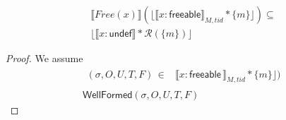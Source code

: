  \begin{lemma}
   \label{lemma:free}
\begin{align*}
  \llbracket Free(x) \rrbracket (\lfloor \llbracket x:\textsf{freeable} \rrbracket_{M,tid} * \{m\}\rfloor)  \subseteq \\
                                                              \lfloor \llbracket x:\textsf{undef} \rrbracket  * \mathcal{R}(\{m\})\rfloor
\end{align*}
 \end{lemma}
 \begin{proof}
We assume
\begin{gather}\label{ahu1free}
  \begin{aligned}
    (\sigma, O, U, T,F) \, \in &  \llbracket x:\textsf{freeable} \, \rrbracket_{M,tid} * \{m\}\rfloor) 
    \end{aligned} \\
\textsf{WellFormed}(\sigma,O,U,T,F)
\label{ahu2free}
\end{gather}


\end{proof}
